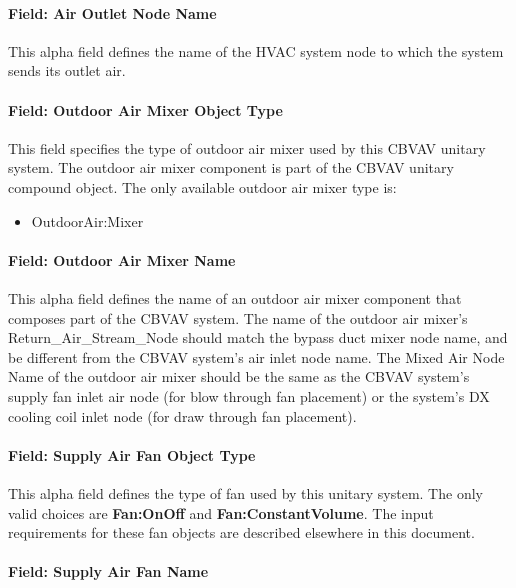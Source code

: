\paragraph{Field: Air Outlet Node Name}\label{field-air-outlet-node-name-3-002}

This alpha field defines the name of the HVAC system node to which the system sends its outlet air.

\paragraph{Field: Outdoor Air Mixer Object Type}\label{field-outdoor-air-mixer-object-type}

This field specifies the type of outdoor air mixer used by this CBVAV unitary system. The outdoor air mixer component is part of the CBVAV unitary compound object. The only available outdoor air mixer type is:

\begin{itemize}
\tightlist
\item
  OutdoorAir:Mixer
\end{itemize}

\paragraph{Field: Outdoor Air Mixer Name}\label{field-outdoor-air-mixer-name}

This alpha field defines the name of an outdoor air mixer component that composes part of the CBVAV system. The name of the outdoor air mixer's Return\_Air\_Stream\_Node should match the bypass duct mixer node name, and be different from the CBVAV system's air inlet node name. The Mixed Air Node Name of the outdoor air mixer should be the same as the CBVAV system's supply fan inlet air node (for blow through fan placement) or the system's DX cooling coil inlet node (for draw through fan placement).

\paragraph{Field: Supply Air Fan Object Type}\label{field-supply-air-fan-object-type-3}

This alpha field defines the type of fan used by this unitary system. The only valid choices are \textbf{Fan:OnOff} and \textbf{Fan:ConstantVolume}. The input requirements for these fan objects are described elsewhere in this document.

\paragraph{Field: Supply Air Fan Name}\label{field-supply-air-fan-name-3}

